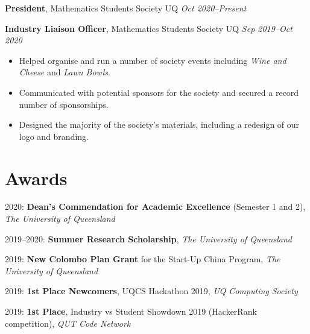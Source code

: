 \documentclass[9pt, a4paper]{extarticle}
\begin{document}
\textbf{President}, Mathematics Students Society UQ \hfill \textit{Oct 2020--Present}

\textbf{Industry Liaison Officer}, Mathematics Students Society UQ \hfill \textit{Sep 2019--Oct 2020}
\begin{itemize}[label=\textcolor{gray!80}{\textbullet}]
    \item Helped organise and run a number of society events including \textit{Wine and Cheese} and \textit{Lawn Bowls}.
    \item Communicated with potential sponsors for the society and secured a record number of sponsorships.
    \item Designed the majority of the society's materials, including a redesign of our logo and branding.
\end{itemize}



\section*{Awards}

2020: \textbf{Dean's Commendation for Academic Excellence} (Semester 1 and 2), \textit{The University of Queensland}

2019--2020: \textbf{Summer Research Scholarship}, \textit{The University of Queensland}

2019: \textbf{New Colombo Plan Grant} for the Start-Up China Program, \textit{The University of Queensland}

2019: \textbf{1st Place Newcomers}, UQCS Hackathon 2019, \textit{UQ Computing Society}

2019: \textbf{1st Place}, Industry vs Student Showdown 2019 (HackerRank competition), \textit{QUT Code Network}

\end{document}
